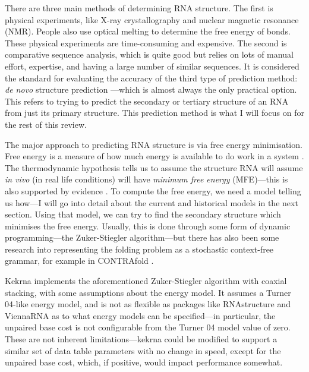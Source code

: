 \documentclass{cshonours}
\begin{document}
There are three main methods of determining RNA structure. The first is physical experiments, like X-ray crystallography and nuclear magnetic resonance (NMR). People also use optical melting to determine the free energy of bonds. These physical experiments are time-consuming and expensive. The second is comparative sequence analysis, which is quite good but relies on lots of manual effort, expertise, and having a large number of similar sequences. It is considered the standard for evaluating the accuracy of the third type of prediction method: \emph{de novo} structure prediction \cite{tPartition}---which is almost always the only practical option. This refers to trying to predict the secondary or tertiary structure of an RNA from just its primary structure. This prediction method is what I will focus on for the rest of this review.

The major approach to predicting RNA structure is via free energy minimisation. Free energy is a measure of how much energy is available to do work in a system \cite{perrotThermodynamics}. The thermodynamic hypothesis \cite{anfinsenThermodynamicHypothesis} tells us to assume the structure RNA will assume \emph{in vivo} (in real life conditions) will have \emph{minimum free energy} (MFE)---this is also supported by evidence \cite{tinocoHowRnaFolds}. To compute the free energy, we need a model telling us how---I will go into detail about the current and historical models in the next section. Using that model, we can try to find the secondary structure which minimises the free energy. Usually, this is done through some form of dynamic programming---the Zuker-Stiegler algorithm---but there has also been some research into representing the folding problem as a stochastic context-free grammar, for example in CONTRAfold \cite{doContrafold}.

Kekrna implements the aforementioned Zuker-Stiegler algorithm with coaxial stacking, with some assumptions about the energy model. It assumes a Turner 04-like energy model, and is not as flexible as packages like RNAstructure \cite{rnastructure} and ViennaRNA \cite{viennarna} as to what energy models can be specified---in particular, the unpaired base cost is not configurable from the Turner 04 model value of zero. These are not inherent limitations---kekrna could be modified to support a similar set of data table parameters with no change in speed, except for the unpaired base cost, which, if positive, would impact performance somewhat.
\end{document}
